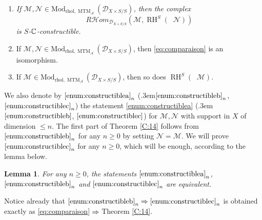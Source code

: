 \documentclass[english]{smfart}
\numberwithin{subsection}{section}
\newenvironment{enumeratea}
{\bgroup\def\theenumi{\alph{enumi}}\begin{enumerate}}
{\end{enumerate}\egroup}
\def\sha{\mathcal{A}}\let\cA\sha
\def\shd{\mathcal{D}}\let\cD\shd
\def\shm{\mathcal{M}}
\def\shn{\mathcal{N}}\let\shn\shn
\newcommand{\Rhom}{R\shhom}
\newcommand{\shhom}{\mathcal{H}\!\mathit{om}}\let\ho\shhom
\DeclareMathOperator{\RH}{RH}
\newcommand{\rhol}{\mathrm{rhol}}
\newcommand{\Mod}{\mathrm{Mod}}
\newcommand{\XS}{X\times S}
\newcommand{\DXS}{\shd_{\XS/S}}
\DeclareMathOperator{\MTM}{MTM}
\DeclareMathOperator{\pSol}{{}^\mathrm{p}Sol}
\let\leq\leqslant
\let\geq\geqslant
\def\resp{\text{resp.}\kern.3em}
\numberwithin{equation}{section}
\theoremstyle{plain}
\newtheorem{lemma}[equation]{Lemma}
\theoremstyle{definition}
\def\implique{\mathchoice{\Longrightarrow}{\Rightarrow}{\Rightarrow}{\Rightarrow}}
\begin{document}
\begin{enumeratea}
\item\label{enum:constructiblea}\itshape
If $\shm,\shn\in\Mod_{\rhol,\MTM_\sha}(\DXS)$, then the complex
\[
\Rhom_{\DXS}(\shm, \RH^S(\pSol\shn))
\]
is $S$-$\mathbb{C}$-constructible.

\item\label{enum:constructibleb}
If $\shm,\shn\in\Mod_{\rhol,\MTM_\sha}(\DXS)$, then \eqref{eq:comparaison} is an isomorphism.

\item\label{enum:constructiblec}
If $\shm\in\Mod_{\rhol,\MTM_\sha}(\DXS)$, then so does $\RH^S(\pSol\shm)$.
\end{enumeratea}

We also denote by $\eqref{enum:constructiblea}_n$ (\resp $\eqref{enum:constructibleb}_n$, $\eqref{enum:constructiblec}_n$) the statement \eqref{enum:constructiblea} (\resp $\eqref{enum:constructibleb}$, $\eqref{enum:constructiblec}$) for $\shm,\shn$ with support in $X$ of dimension $\leq n$. The first part of Theorem \ref{C:14} follows from~$\eqref{enum:constructibleb}_n$ for any $n\geq0$ by setting $\shn=\shm$. We will prove $\eqref{enum:constructiblec}_n$ for any $n\geq0$, which will be enough, according to the lemma below.

\begin{lemma}\label{lem:abc}
For any $n\geq0$, the statements $\eqref{enum:constructiblea}_n$, $\eqref{enum:constructibleb}_n$ and $\eqref{enum:constructiblec}_n$ are equivalent.
\end{lemma}

Notice already that $\eqref{enum:constructibleb}_n\implique\eqref{enum:constructiblec}_n$ is obtained exactly as \eqref{eq:comparaison}${}\implique{}$Theorem \ref{C:14}.
\end{document}
